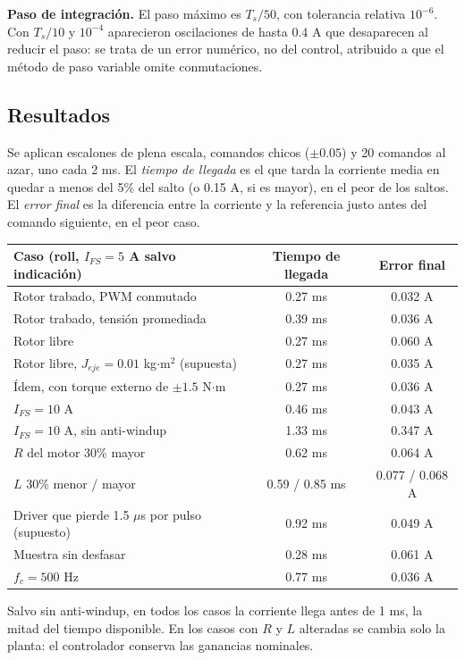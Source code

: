 \textbf{Paso de integración.} El paso máximo es $T_s/50$, con tolerancia relativa $10^{-6}$. Con $T_s/10$ y $10^{-4}$ aparecieron oscilaciones de hasta 0.4 A que desaparecen al reducir el paso: se trata de un error numérico, no del control, atribuido a que el método de paso variable omite conmutaciones.

\subsection{Resultados}
\label{sec:cc_resultados}
Se aplican escalones de plena escala, comandos chicos ($\pm 0.05$) y 20 comandos al azar, uno cada 2 ms. El \emph{tiempo de llegada} es el que tarda la corriente media en quedar a menos del 5\% del salto (o 0.15 A, si es mayor), en el peor de los saltos. El \emph{error final} es la diferencia entre la corriente y la referencia justo antes del comando siguiente, en el peor caso.

\begin{center}
\begin{tabular}{lcc}\toprule
Caso (roll, $I_{FS} = 5$ A salvo indicación) & Tiempo de llegada & Error final\\\midrule
Rotor trabado, PWM conmutado & 0.27 ms & 0.032 A\\
Rotor trabado, tensión promediada & 0.39 ms & 0.036 A\\
Rotor libre & 0.27 ms & 0.060 A\\
Rotor libre, $J_{eje} = 0.01$ kg$\cdot$m$^2$ (supuesta) & 0.27 ms & 0.035 A\\
Ídem, con torque externo de $\pm 1.5$ N$\cdot$m & 0.27 ms & 0.036 A\\
$I_{FS} = 10$ A & 0.46 ms & 0.043 A\\
$I_{FS} = 10$ A, sin anti-windup & 1.33 ms & 0.347 A\\
$R$ del motor 30\% mayor & 0.62 ms & 0.064 A\\
$L$ 30\% menor / mayor & 0.59 / 0.85 ms & 0.077 / 0.068 A\\
Driver que pierde 1.5 $\mu$s por pulso (supuesto) & 0.92 ms & 0.049 A\\
Muestra sin desfasar & 0.28 ms & 0.061 A\\
$f_c = 500$ Hz & 0.77 ms & 0.036 A\\\bottomrule
\end{tabular}
\end{center}
Salvo sin anti-windup, en todos los casos la corriente llega antes de 1 ms, la mitad del tiempo disponible. En los casos con $R$ y $L$ alteradas se cambia solo la planta: el controlador conserva las ganancias nominales.

